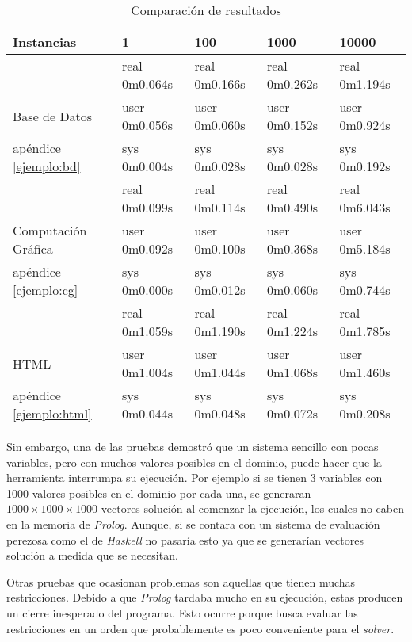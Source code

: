 \begin{table}[h]
  \centering	
{}
\begin{tabular}{|l||l|l|l|l|}
\hline
    Instancias & 1 & 100 & 1000 & 10000 \\
    \hline
    \hline
    ~ & real	0m0.064s & real	0m0.166s & real	0m0.262s & real	0m1.194s \\
    Base de Datos  & user	0m0.056s & user	0m0.060s & user	0m0.152s & user	0m0.924s \\
    apéndice \ref{ejemplo:bd} & sys	0m0.004s & sys	0m0.028s & sys	0m0.028s & sys	0m0.192s \\
    \hline
    \hline
    ~ & real	0m0.099s & real	0m0.114s & real	0m0.490s & real	0m6.043s \\
    Computación Gráfica  & user	0m0.092s & user	0m0.100s & user	0m0.368s & user	0m5.184s \\
    apéndice \ref{ejemplo:cg} & sys	0m0.000s & sys	0m0.012s & sys	0m0.060s & sys	0m0.744s \\
    \hline
    \hline
    ~ & real	0m1.059s & real	0m1.190s & real	0m1.224s & real	0m1.785s \\
   HTML  & user	0m1.004s & user	0m1.044s & user	0m1.068s & user	0m1.460s \\
   apéndice  \ref{ejemplo:html} & sys	0m0.044s & sys	0m0.048s & sys	0m0.072s & sys	0m0.208s \\
    \hline
\end{tabular}
\caption{Comparación de resultados}
\label{table:comparacion_resultados}
\end{table}

Sin embargo, una de las pruebas demostró que un sistema sencillo con pocas variables, pero con muchos
valores posibles en el dominio, puede hacer que la herramienta interrumpa su ejecución.
Por ejemplo si se tienen 3 variables con 1000 valores posibles en el dominio por cada una, se generaran
$1000 \times 1000 \times 1000$ vectores solución al comenzar la ejecución, los cuales no caben en la 
memoria de \emph{Prolog}. Aunque, si se contara con un sistema de 
evaluación perezosa como el de \emph{Haskell} no pasaría esto ya que se generarían 
vectores solución a medida que se necesitan.

Otras pruebas que ocasionan problemas son aquellas que tienen muchas restricciones. 
Debido a que \emph{Prolog} tardaba mucho en su ejecución, estas producen un cierre inesperado del programa. 
Esto ocurre porque busca evaluar las restricciones en un orden que probablemente es poco conveniente
para el \emph{solver}.

